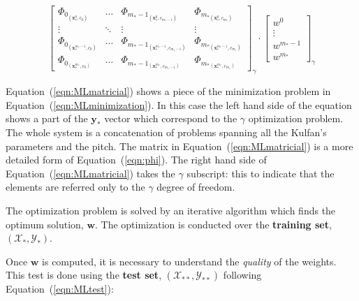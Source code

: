 \begin{equation}
\begin{bmatrix}
        \Phi_{0_{(\boldsymbol{x}^{0}_{*}, c_0)}} & \ldots & \Phi_{{m_{*} - 1}_{( \boldsymbol{x}^{0}_{*}, c_{m_{*} - 1})}} & \Phi_{{m_{*}}_{( \boldsymbol{x}^{0}_{*}, c_{m_{*}})}} \\
        \vdots & \ddots & \vdots & \vdots \\
        \Phi_{0_{(\boldsymbol{x}^{m_{*} - 1}_{*}, c_0)}} & \ldots & \Phi_{{m_{*} - 1}_{( \boldsymbol{x}^{m_{*} - 1}_{*}, c_{m_{*} - 1})}} & \Phi_{{m_{*}}_{( \boldsymbol{x}^{m_{*} - 1}_{*}, c_{m_{*}})}} \\
        \Phi_{0_{(\boldsymbol{x}^{m_{*}}_{*}, c_0)}}     & \ldots & \Phi_{{m_{*} - 1}_{( \boldsymbol{x}^{m_{*}}_{*}, c_{m_{*} - 1})}}     & \Phi_{{m_{*}}_{( \boldsymbol{x}^{m_{*}}_{*}, c_{m_{*}})}}  
    \end{bmatrix}_{\gamma}
    \cdot 
    \begin{bmatrix}
        w^0 \\ 
        \vdots \\
        w^{m_* - 1} \\  
        w^{m_*}
    \end{bmatrix}_{\gamma}
    \label{eqn:MLmatricial}
\end{equation}

Equation~(\ref{eqn:MLmatricial}) shows a piece of the minimization problem in Equation~(\ref{eqn:MLminimization}). In this case the left hand side of the equation
shows a part of the $\boldsymbol{y_{*}}$ vector which correspond to the $\gamma$ optimization problem. The whole system is a concatenation of problems spanning 
all the Kulfan's parameters and the pitch. The matrix in Equation~(\ref{eqn:MLmatricial}) is a more detailed form of Equation~(\ref{eqn:phi}). The right hand side of 
Equation~(\ref{eqn:MLmatricial}) takes the $\gamma$ subscript: this to indicate that the elements are referred only to the $\gamma$ degree of freedom.

The optimization problem is solved by an iterative algorithm which finds the optimum solution, $\boldsymbol{w}$.
The optimization is conducted over the \textbf{training set}, $(\mathcal{X}_{*}, \mathcal{Y}_{*})$. 

Once $\boldsymbol{w}$ is computed, it is necessary to understand the \textit{quality} of the weights. 
This test is done using the \textbf{test set}, $(\mathcal{X}_{**}, \mathcal{Y}_{**})$ following Equation~(\ref{eqn:MLtest}):

